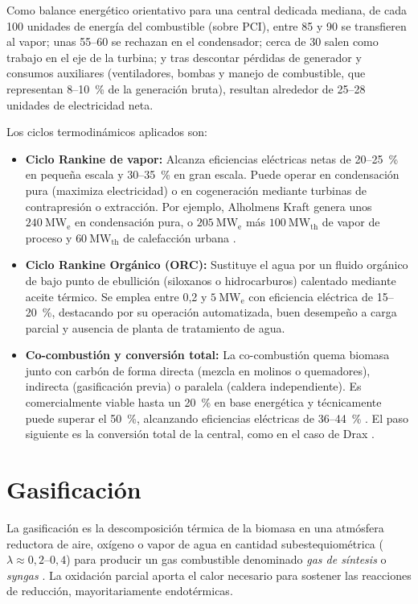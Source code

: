 Como balance energético orientativo para una central dedicada mediana, de cada 100 unidades de energía del combustible (sobre PCI), entre 85 y 90 se transfieren al vapor; unas 55--60 se rechazan en el condensador; cerca de 30 salen como trabajo en el eje de la turbina; y tras descontar pérdidas de generador y consumos auxiliares (ventiladores, bombas y manejo de combustible, que representan 8--10~\% de la generación bruta), resultan alrededor de 25--28 unidades de electricidad neta.

Los ciclos termodinámicos aplicados son:
\begin{itemize}[leftmargin=1.5em]
\item \textbf{Ciclo Rankine de vapor:} Alcanza eficiencias eléctricas netas de 20--25~\% en pequeña escala y 30--35~\% en gran escala. Puede operar en condensación pura (maximiza electricidad) o en cogeneración mediante turbinas de contrapresión o extracción. Por ejemplo, Alholmens Kraft genera unos $240~\mathrm{MW_e}$ en condensación pura, o $205~\mathrm{MW_e}$ más $100~\mathrm{MW_{th}}$ de vapor de proceso y $60~\mathrm{MW_{th}}$ de calefacción urbana \cite{alholmenskraft}.
\item \textbf{Ciclo Rankine Orgánico (ORC):} Sustituye el agua por un fluido orgánico de bajo punto de ebullición (siloxanos o hidrocarburos) calentado mediante aceite térmico. Se emplea entre 0,2 y $5~\mathrm{MW_e}$ con eficiencia eléctrica de 15--20~\%, destacando por su operación automatizada, buen desempeño a carga parcial y ausencia de planta de tratamiento de agua.
\item \textbf{Co-combustión y conversión total:} La co-combustión quema biomasa junto con carbón de forma directa (mezcla en molinos o quemadores), indirecta (gasificación previa) o paralela (caldera independiente). Es comercialmente viable hasta un 20~\% en base energética y técnicamente puede superar el 50~\%, alcanzando eficiencias eléctricas de 36--44~\% \cite{irena2013cofiring}. El paso siguiente es la conversión total de la central, como en el caso de Drax \cite{drax2025annual}.
\end{itemize}

\section{Gasificación}
\label{sec:gasificacion}

La gasificación es la descomposición térmica de la biomasa en una atmósfera reductora de aire, oxígeno o vapor de agua en cantidad subestequiométrica ($\lambda \approx 0{,}2\text{--}0{,}4$) para producir un gas combustible denominado \textit{gas de síntesis} o \textit{syngas} \cite{ieabioenergy2025task33, idae2007gasificacion}. La oxidación parcial aporta el calor necesario para sostener las reacciones de reducción, mayoritariamente endotérmicas.

